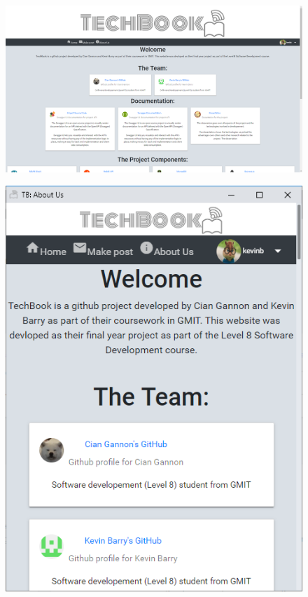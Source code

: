 \begin{figure}[H]
\centering
\begin{minipage}{.75\textwidth}
  \centering
  \includegraphics[width=.9\linewidth]{img/ui/about_PC.PNG}
  \label{fig:aboutPC}
\end{minipage}%
\begin{minipage}{.25\textwidth}
  \centering
  \includegraphics[width=.9\linewidth]{img/ui/about_MOBILE.PNG}
  \label{fig:aboutMobile}
\end{minipage}
\end{figure}